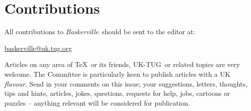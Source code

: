 \documentclass[a4paper,twoside,twocolumn]{article}
\def \ukt {UK-TUG}
\newcommand{\BV}{\textit{Baskerville}}
\begin{document}
\section{Contributions}
\noindent All contributions to \BV\ should be sent to the editor at:
\begin{center}
\href{mailto:baskerville@uk.tug.org}{baskerville@uk.tug.org}
\end{center}

Articles on any area of \TeX\ or its friends, \ukt\ or related topics are very welcome. The Committee is particularly keen to publish articles with a UK \textit{flavour}. Send in your comments on this issue; your suggestions, letters, thoughts, tips and hints, articles, jokes, questions, requests for help, jobs, cartoons or puzzles -- anything relevant will be considered for publication.

\end{document}
